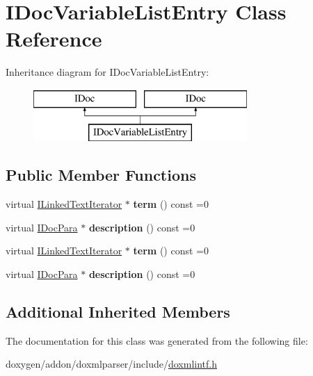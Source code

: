 \hypertarget{class_i_doc_variable_list_entry}{}\section{I\+Doc\+Variable\+List\+Entry Class Reference}
\label{class_i_doc_variable_list_entry}
Inheritance diagram for I\+Doc\+Variable\+List\+Entry\+:\begin{figure}[H]
\begin{center}
\leavevmode
\includegraphics[height=2.000000cm]{class_i_doc_variable_list_entry}
\end{center}
\end{figure}
\subsection*{Public Member Functions}
\begin{DoxyCompactItemize}
\item 
\mbox{\label{class_i_doc_variable_list_entry_acb1c323bc85f584ee153eab4a5d60372}} 
virtual \mbox{\hyperlink{class_i_linked_text_iterator}{I\+Linked\+Text\+Iterator}} $\ast$ {\bfseries term} () const =0
\item 
\mbox{\label{class_i_doc_variable_list_entry_a5568459754f6610e5a9bd614aa678b73}} 
virtual \mbox{\hyperlink{class_i_doc_para}{I\+Doc\+Para}} $\ast$ {\bfseries description} () const =0
\item 
\mbox{\label{class_i_doc_variable_list_entry_acb1c323bc85f584ee153eab4a5d60372}} 
virtual \mbox{\hyperlink{class_i_linked_text_iterator}{I\+Linked\+Text\+Iterator}} $\ast$ {\bfseries term} () const =0
\item 
\mbox{\label{class_i_doc_variable_list_entry_a5568459754f6610e5a9bd614aa678b73}} 
virtual \mbox{\hyperlink{class_i_doc_para}{I\+Doc\+Para}} $\ast$ {\bfseries description} () const =0
\end{DoxyCompactItemize}
\subsection*{Additional Inherited Members}


The documentation for this class was generated from the following file\+:\begin{DoxyCompactItemize}
\item 
doxygen/addon/doxmlparser/include/\mbox{\hyperlink{include_2doxmlintf_8h}{doxmlintf.\+h}}\end{DoxyCompactItemize}

